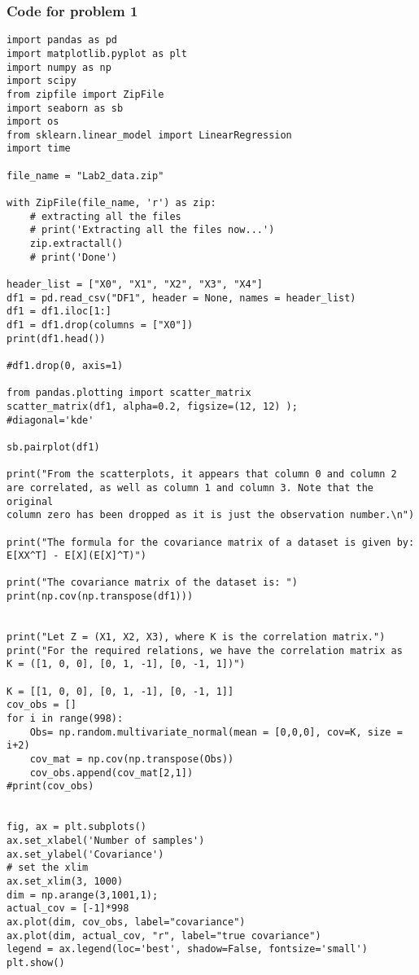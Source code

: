 \documentclass[12pt]{article}%
\begin{document}
\subsubsection*{Code for problem 1}
\begin{lstlisting}
import pandas as pd
import matplotlib.pyplot as plt
import numpy as np
import scipy
from zipfile import ZipFile 
import seaborn as sb
import os
from sklearn.linear_model import LinearRegression
import time

file_name = "Lab2_data.zip"

with ZipFile(file_name, 'r') as zip: 
    # extracting all the files 
    # print('Extracting all the files now...') 
    zip.extractall() 
    # print('Done')
    
header_list = ["X0", "X1", "X2", "X3", "X4"]
df1 = pd.read_csv("DF1", header = None, names = header_list)
df1 = df1.iloc[1:]
df1 = df1.drop(columns = ["X0"])
print(df1.head())

#df1.drop(0, axis=1)

from pandas.plotting import scatter_matrix
scatter_matrix(df1, alpha=0.2, figsize=(12, 12) );
#diagonal='kde'

sb.pairplot(df1)

print("From the scatterplots, it appears that column 0 and column 2 
are correlated, as well as column 1 and column 3. Note that the original
column zero has been dropped as it is just the observation number.\n")

print("The formula for the covariance matrix of a dataset is given by:
E[XX^T] - E[X](E[X]^T)")

print("The covariance matrix of the dataset is: ")
print(np.cov(np.transpose(df1)))


print("Let Z = (X1, X2, X3), where K is the correlation matrix.")
print("For the required relations, we have the correlation matrix as
K = ([1, 0, 0], [0, 1, -1], [0, -1, 1])")

K = [[1, 0, 0], [0, 1, -1], [0, -1, 1]]
cov_obs = []
for i in range(998):
    Obs= np.random.multivariate_normal(mean = [0,0,0], cov=K, size = i+2)
    cov_mat = np.cov(np.transpose(Obs))
    cov_obs.append(cov_mat[2,1])
#print(cov_obs)


fig, ax = plt.subplots()
ax.set_xlabel('Number of samples') 
ax.set_ylabel('Covariance')
# set the xlim
ax.set_xlim(3, 1000)
dim = np.arange(3,1001,1);
actual_cov = [-1]*998
ax.plot(dim, cov_obs, label="covariance") 
ax.plot(dim, actual_cov, "r", label="true covariance") 
legend = ax.legend(loc='best', shadow=False, fontsize='small')
plt.show()
\end{lstlisting}
\end{document}
